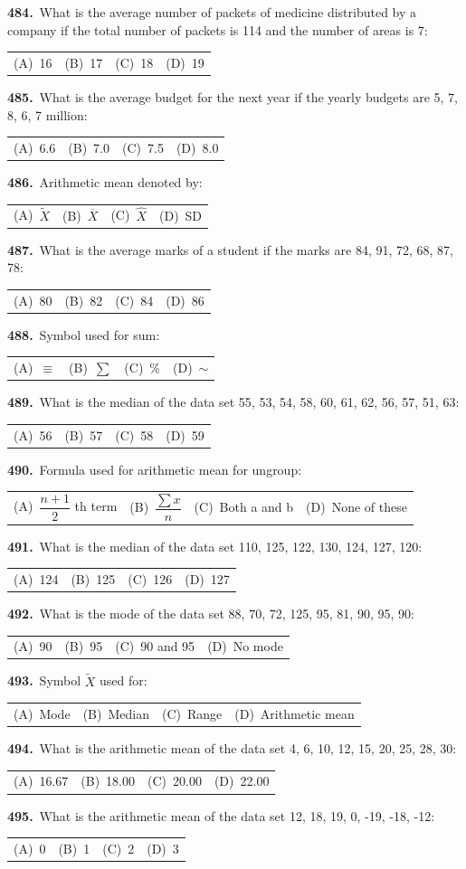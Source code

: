 \documentclass[11pt,a4paper]{article}
\makeatletter
\newcommand{\mcq}[6]{%
  \Needspace{4\baselineskip}%
  \par\medskip\noindent\textbf{#1.}\ #2\par\nopagebreak
  \noindent\begin{tabularx}{\linewidth}{@{\hspace{1.5em}}*{4}{>{\raggedright\arraybackslash}X}@{}}
    (A)~#3 & (B)~#4 & (C)~#5 & (D)~#6
  \end{tabularx}\par}
\makeatother
\begin{document}
\mcq{484}{What is the average number of packets of medicine distributed by a company if the total number of packets is 114 and the number of areas is 7:}{16}{17}{18}{19}
\mcq{485}{What is the average budget for the next year if the yearly budgets are 5, 7, 8, 6, 7 million:}{6.6}{7.0}{7.5}{8.0}
\mcq{486}{Arithmetic mean denoted by:}{$\widetilde{X}$}{$\overline{X}$}{$\widehat{X}$}{SD}
\mcq{487}{What is the average marks of a student if the marks are 84, 91, 72, 68, 87, 78:}{80}{82}{84}{86}
\mcq{488}{Symbol used for sum:}{$\equiv$}{$\sum$}{\%}{$\sim$}
\mcq{489}{What is the median of the data set 55, 53, 54, 58, 60, 61, 62, 56, 57, 51, 63:}{56}{57}{58}{59}
\mcq{490}{Formula used for arithmetic mean for ungroup:}{$\dfrac{n+1}{2}$ th term}{$\dfrac{\sum x}{n}$}{Both a and b}{None of these}
\mcq{491}{What is the median of the data set 110, 125, 122, 130, 124, 127, 120:}{124}{125}{126}{127}
\mcq{492}{What is the mode of the data set 88, 70, 72, 125, 95, 81, 90, 95, 90:}{90}{95}{90 and 95}{No mode}
\mcq{493}{Symbol $\widetilde{X}$ used for:}{Mode}{Median}{Range}{Arithmetic mean}
\mcq{494}{What is the arithmetic mean of the data set 4, 6, 10, 12, 15, 20, 25, 28, 30:}{16.67}{18.00}{20.00}{22.00}
\mcq{495}{What is the arithmetic mean of the data set 12, 18, 19, 0, -19, -18, -12:}{0}{1}{2}{3}
\end{document}
